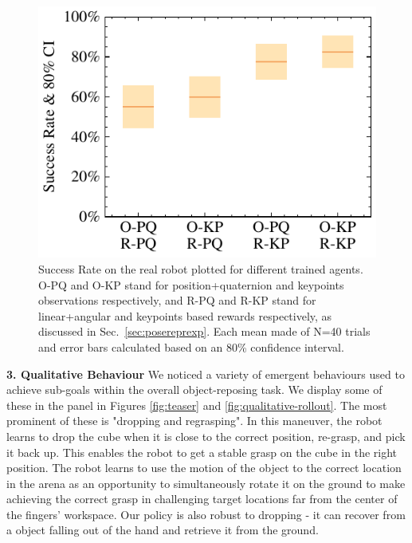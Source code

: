 \documentclass[letterpaper, 10 pt, conference]{ieeeconf}  %
\newcommand{\secref}[1]{Sec.~\ref{#1}}
\begin{document}



\begin{figure}[!t]
\centering
  \includegraphics[width=0.8\linewidth]{figure/exp4/rr_boxplot.pdf}  
    \caption{
       Success Rate on the real robot plotted for different trained agents. O-PQ and O-KP stand for position+quaternion and keypoints observations respectively, and R-PQ and R-KP stand for linear+angular and keypoints based rewards respectively, as discussed in \secref{sec:posereprexp}. Each mean made of N=40 trials and error bars calculated based on an 80\% confidence interval.
    }   \label{fig:sim2real}
\end{figure}


\noindent \textbf{3. Qualitative Behaviour} We noticed a variety of emergent behaviours used to achieve sub-goals within the overall object-reposing task. We display some of these in the panel in Figures \ref{fig:teaser} and \ref{fig:qualitative-rollout}. The most prominent of these is "dropping and regrasping". In this maneuver, the robot learns to drop the cube when it is close to the correct position, re-grasp, and pick it back up. This enables the robot to get a stable grasp on the cube in the right position. The robot learns to use the motion of the object to the correct location in the arena as an opportunity to simultaneously rotate it on the ground to make achieving the correct grasp in challenging target locations far from the center of the fingers' workspace. Our policy is also robust to dropping - it can recover from a object falling out of the hand and retrieve it from the ground.
\end{document}
